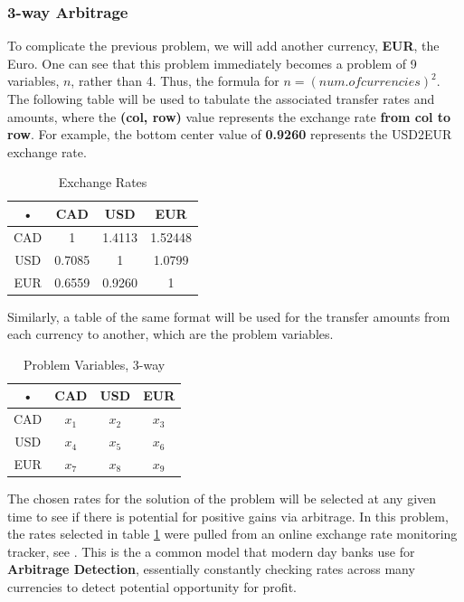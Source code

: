 \documentclass[12pt]{article}
\begin{document}
\subsubsection{3-way Arbitrage}
To complicate the previous problem, we will add another currency, \textbf{EUR}, the Euro. One can see that this problem immediately becomes a problem of 9 variables, $n$, rather than 4. Thus, the formula for $n = (num. of currencies)^{2}$. The following table will be used to tabulate the associated transfer rates and amounts, where the \textbf{(col, row)} value represents the exchange rate \textbf{from col to row}. For example, the bottom center value of \textbf{0.9260} represents the USD2EUR exchange rate.
\begin{table}[H]
\centering
\begin{tabular}{|c|c|c|c|}
\hline 
• & CAD & USD & EUR \\ 
\hline 
CAD & 1 & 1.4113 & 1.52448 \\ 
\hline 
USD & 0.7085 & 1 & 1.0799 \\ 
\hline 
EUR & 0.6559 & 0.9260 & 1 \\ 
\hline 
\end{tabular} 
\caption{Exchange Rates}
\label{tab:rates}
\end{table}
Similarly, a table of the same format will be used for the transfer amounts from each currency to another, which are the problem variables.
\begin{table}[H]
\centering
\begin{tabular}{|c|c|c|c|}
\hline 
• & CAD & USD & EUR \\ 
\hline 
CAD & $x_{1}$ & $x_{2}$ & $x_{3}$ \\ 
\hline 
USD & $x_{4}$ & $x_{5}$ & $x_{6}$ \\ 
\hline 
EUR & $x_{7}$ & $x_{8}$ & $x_{9}$ \\ 
\hline 
\end{tabular} 
\caption{Problem Variables, 3-way}
\end{table}
The chosen rates for the solution of the problem will be selected at any given time to see if there is potential for positive gains via arbitrage. In this problem, the rates selected in table \ref{tab:rates} were pulled from an online exchange rate monitoring tracker, see \cite{xe}. This is the a common model that modern day banks use for \textbf{Arbitrage Detection}, essentially constantly checking rates across many currencies to detect potential opportunity for profit.
\end{document}
